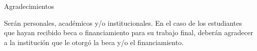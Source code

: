 \pagestyle{empty}

\begin{center}
    {\Large{Agradecimientos}}
\end{center}


Serán personales, académicos y/o institucionales.
En el caso de los estudiantes que hayan recibido beca o financiamiento
para su trabajo final, deberán agradecer a la institución que le otorgó
la beca y/o el financiamiento.